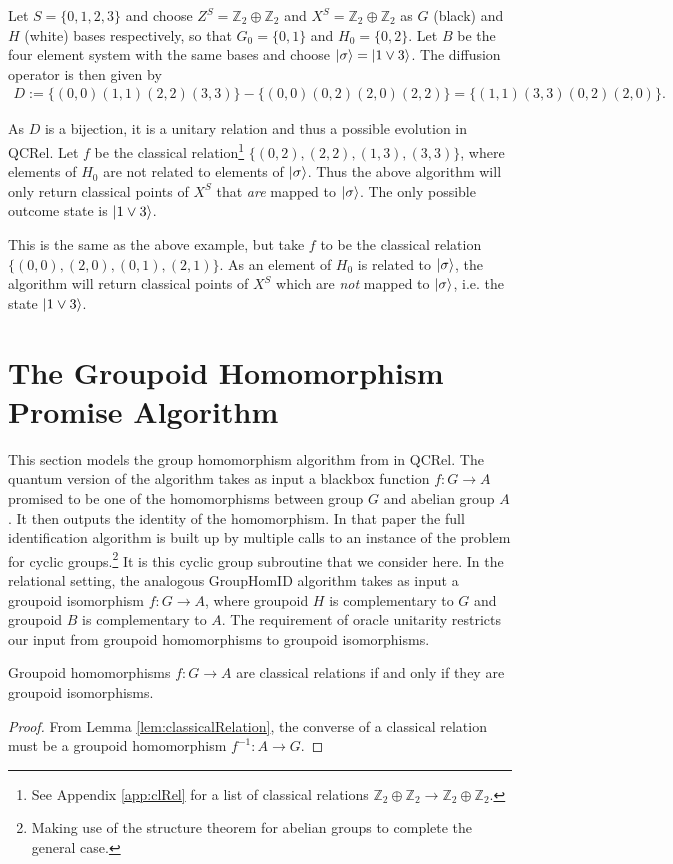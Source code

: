 \begin{example}
Let $S=\{0,1,2,3\}$ and choose $Z^S=\mathbb{Z}_2\oplus\mathbb{Z}_2$ and $X^S=\mathbb{Z}_2\oplus\mathbb{Z}_2$ as $G$ (black) and $H$ (white) bases respectively, so that $G_0=\{0,1\}$ and $H_0 = \{0,2\}$. Let $B$ be the four element system with the same bases and choose $| \sigma \rangle=| 1\vee3 \rangle$. The diffusion operator is then given by
\begin{align*}
D := \{(0,0)(1,1)(2,2)(3,3)\}-\{(0,0)(0,2)(2,0)(2,2)\}=\{(1,1)(3,3)(0,2)(2,0)\}.
\end{align*}

As $D$ is a bijection, it is a unitary relation and thus a possible evolution in QCRel. Let $f$ be the classical relation\footnote{See Appendix \ref{app:clRel} for a list of classical relations $\mathbb{Z}_2\oplus\mathbb{Z}_2\to\mathbb{Z}_2\oplus\mathbb{Z}_2$.} $\{(0,2),(2,2),(1,3),(3,3)\}$, where elements of $H_0$ are not related to elements of $| \sigma \rangle$. Thus the above algorithm will only return classical points of $X^{S}$ that \textit{are} mapped to $| \sigma \rangle$.  The only possible outcome state is $| 1\vee 3 \rangle$.
\end{example}

\begin{example}
This is the same as the above example, but take $f$ to be the classical relation $\{(0,0),(2,0),(0,1),(2,1)\}$. As an element of $H_0$ is related to $| \sigma \rangle$, the algorithm will return classical points of $X^S$ which are \emph{not} mapped to $| \sigma \rangle$, i.e. the state $| 1\vee3 \rangle$.
\end{example}

\section{The Groupoid Homomorphism Promise Algorithm}

This section models the group homomorphism algorithm from \cite{zeng2014abstract} in QCRel.  The quantum version of the algorithm takes as input a blackbox function $f:G\to A$ promised to be one of the homomorphisms between group $G$ and abelian group $A$.  It then outputs the identity of the homomorphism. In that paper the full identification algorithm is built up by multiple calls to an instance of the problem for cyclic groups.\footnote{Making use of the structure theorem for abelian groups to complete the general case.} It is this cyclic group subroutine that we consider here. In the relational setting, the analogous GroupHomID algorithm takes as input a groupoid isomorphism $f:G\to A$, where groupoid $H$ is complementary to $G$ and groupoid $B$ is complementary to $A$.  The requirement of oracle unitarity restricts our input from groupoid homomorphisms to groupoid isomorphisms.
\begin{corollary}
Groupoid homomorphisms $f:G\to A$ are classical relations if and only if they are groupoid isomorphisms.
\end{corollary}
\begin{proof}
From Lemma \ref{lem:classicalRelation}, the converse of a classical relation must be a groupoid homomorphism $f^{-1}:A\to G$.
\end{proof}


